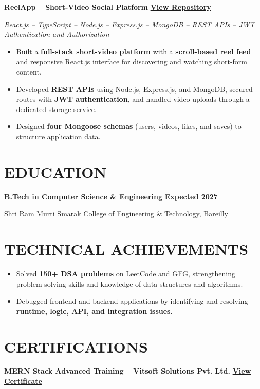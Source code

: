 \documentclass[10pt,a4paper]{article}
\begin{document}
\textbf{ReelApp -- Short-Video Social Platform}
\hfill
\href{https://github.com/Amjadkhan9756/ReelApp}
{\textbf{View Repository}}

\textit{React.js -- TypeScript -- Node.js -- Express.js -- MongoDB --
REST APIs -- JWT Authentication and Authorization}

\begin{itemize}
    \item Built a \textbf{full-stack short-video platform} with a
    \textbf{scroll-based reel feed} and responsive React.js interface
    for discovering and watching short-form content.

    \item Developed \textbf{REST APIs} using Node.js, Express.js,
    and MongoDB, secured routes with \textbf{JWT authentication},
    and handled video uploads through a dedicated storage service.

    \item Designed \textbf{four Mongoose schemas} (users, videos,
    likes, and saves) to structure application data.
\end{itemize}

\section{EDUCATION}

\textbf{B.Tech in Computer Science \& Engineering}
\hfill
\textbf{Expected 2027}

Shri Ram Murti Smarak College of Engineering \& Technology, Bareilly

\section{TECHNICAL ACHIEVEMENTS}

\begin{itemize}
    \item Solved \textbf{150+ DSA problems} on LeetCode and GFG,
    strengthening problem-solving skills and knowledge of
    data structures and algorithms.

    \item Debugged frontend and backend applications by identifying
    and resolving \textbf{runtime, logic, API, and integration issues}.
\end{itemize}

\section{CERTIFICATIONS}

\textbf{MERN Stack Advanced Training -- Vitsoft Solutions Pvt. Ltd.}
\hfill
\href{https://github.com/Amjadkhan9756/certification/blob/main/Amjadkhann.pdf}
{\textbf{View Certificate}}
\end{document}
